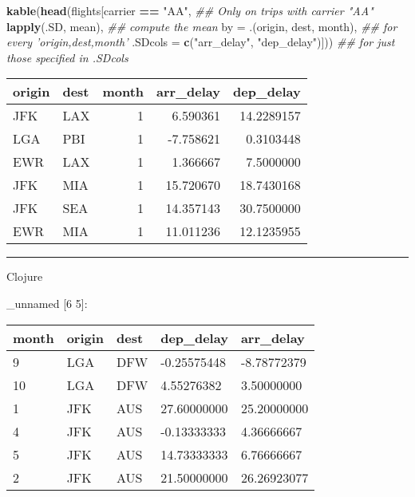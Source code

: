 \documentclass[]{article}
\newenvironment{Shaded}{\begin{snugshade}}{\end{snugshade}}
\newcommand{\CommentTok}[1]{\textcolor[rgb]{0.56,0.35,0.01}{\textit{#1}}}
\newcommand{\DataTypeTok}[1]{\textcolor[rgb]{0.13,0.29,0.53}{#1}}
\newcommand{\DecValTok}[1]{\textcolor[rgb]{0.00,0.00,0.81}{#1}}
\newcommand{\KeywordTok}[1]{\textcolor[rgb]{0.13,0.29,0.53}{\textbf{#1}}}
\newcommand{\NormalTok}[1]{#1}
\newcommand{\OperatorTok}[1]{\textcolor[rgb]{0.81,0.36,0.00}{\textbf{#1}}}
\newcommand{\StringTok}[1]{\textcolor[rgb]{0.31,0.60,0.02}{#1}}
\newcommand{\VariableTok}[1]{\textcolor[rgb]{0.00,0.00,0.00}{#1}}
\begin{document}
\begin{Shaded}
\begin{Highlighting}[]
\KeywordTok{kable}\NormalTok{(}\KeywordTok{head}\NormalTok{(flights[carrier }\OperatorTok{==}\StringTok{ "AA"}\NormalTok{,                         }\CommentTok{## Only on trips with carrier "AA"}
                   \KeywordTok{lapply}\NormalTok{(.SD, mean),                       }\CommentTok{## compute the mean}
                   \DataTypeTok{by =}\NormalTok{ .(origin, dest, month),             }\CommentTok{## for every 'origin,dest,month'}
                   \DataTypeTok{.SDcols =} \KeywordTok{c}\NormalTok{(}\StringTok{"arr_delay"}\NormalTok{, }\StringTok{"dep_delay"}\NormalTok{)])) }\CommentTok{## for just those specified in .SDcols}
\end{Highlighting}
\end{Shaded}

\begin{longtable}[]{@{}llrrr@{}}
\toprule
origin & dest & month & arr\_delay & dep\_delay\tabularnewline
\midrule
\endhead
JFK & LAX & 1 & 6.590361 & 14.2289157\tabularnewline
LGA & PBI & 1 & -7.758621 & 0.3103448\tabularnewline
EWR & LAX & 1 & 1.366667 & 7.5000000\tabularnewline
JFK & MIA & 1 & 15.720670 & 18.7430168\tabularnewline
JFK & SEA & 1 & 14.357143 & 30.7500000\tabularnewline
EWR & MIA & 1 & 11.011236 & 12.1235955\tabularnewline
\bottomrule
\end{longtable}

\begin{center}\rule{0.5\linewidth}{0.5pt}\end{center}

Clojure

\begin{Shaded}
\end{Shaded}

\_unnamed {[}6 5{]}:

\begin{longtable}[]{@{}lllll@{}}
\toprule
month & origin & dest & dep\_delay & arr\_delay\tabularnewline
\midrule
\endhead
9 & LGA & DFW & -0.25575448 & -8.78772379\tabularnewline
10 & LGA & DFW & 4.55276382 & 3.50000000\tabularnewline
1 & JFK & AUS & 27.60000000 & 25.20000000\tabularnewline
4 & JFK & AUS & -0.13333333 & 4.36666667\tabularnewline
5 & JFK & AUS & 14.73333333 & 6.76666667\tabularnewline
2 & JFK & AUS & 21.50000000 & 26.26923077\tabularnewline
\bottomrule
\end{longtable}
\end{document}
